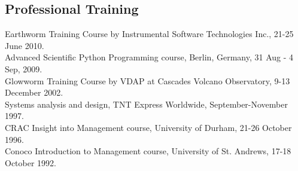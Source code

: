 \documentclass[margin,line]{res}
\begin{document}
\begin{resume}
\section{\sc Professional Training}
Earthworm Training Course by Instrumental Software Technologies Inc., 21-25 June 2010.\\
Advanced Scientific Python Programming course, Berlin, Germany, 31 Aug - 4 Sep, 2009.\\
Glowworm Training Course by VDAP at Cascades Volcano Observatory, 9-13 December 2002.\\
Systems analysis and design, TNT Express Worldwide, September-November 1997.\\
CRAC Insight into Management course, University of Durham, 21-26 October 1996.\\ 
Conoco Introduction to Management course, University of St. Andrews, 17-18 October 1992.\\ 


\end{resume}
\end{document}
